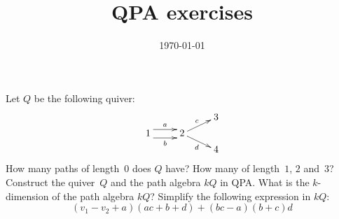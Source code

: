 \documentclass[a4paper]{amsart}
\begin{document}
\title{QPA exercises}

\date{\today}

\maketitle

\begin{Exercise}[title={Paths and algebra elements}]
Let $Q$ be the following quiver:
\[
\xymatrix@R=1ex{
&& 3 \\
1 \ar@<1ex>[r]^a \ar@<-1ex>[r]_b &
2 \ar[ur]^c \ar[dr]_d \\
&& 4
}
\]
\Question How many paths of length~$0$ does $Q$ have?  How many of
length~$1$, $2$ and~$3$?
\Question Construct the quiver~$Q$ and the path algebra $kQ$ in QPA.
\Question What is the $k$-dimension of the path algebra $kQ$?
\Question Simplify the following expression in $kQ$:
\[
(v_1 - v_2 + a)(ac + b + d) + (bc - a)(b + c)d
\]
\end{Exercise}
\end{document}
